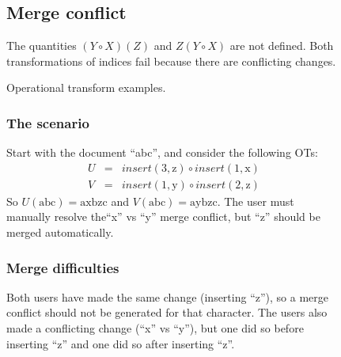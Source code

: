 \documentclass[11pt,titlepage]{article}
\begin{document}
\begin{figure}[h]
\begin{minipage}{\textwidth}
\begin{multicols}{2}
      \subsection*{Merge conflict}
      The quantities \((Y \circ X)(Z)\) and \(Z(Y \circ X)\) are not
      defined.  Both transformations of indices fail because there are
      conflicting changes.
    \end{multicols}
  \end{minipage}
  \caption{Operational transform examples.}
  \label{fig:ot}
\end{figure}

\begin{figure}[h]
  \centering
  \begin{minipage}{\textwidth}
    \begin{multicols}{2}
      \subsubsection*{The scenario}
      Start with the document ``abc'', and consider the following OTs:
      \begin{eqnarray*}
        U &=& insert(3, \mathrm{z}) \circ insert(1, \mathrm{x}) \\
        V &=& insert(1, \mathrm{y}) \circ insert(2, \mathrm{z})
      \end{eqnarray*}
      So \(U(\mathrm{abc}) = \mathrm{axbzc}\) and \(V(\mathrm{abc}) =
      \mathrm{aybzc}\).  The user must manually resolve the``x'' vs
      ``y'' merge conflict, but ``z'' should be merged automatically.
      \subsubsection*{Merge difficulties}
      Both users have made the same change (inserting ``z''), so a
      merge conflict should not be generated for that character.  The
      users also made a conflicting change (``x'' vs ``y''), but one
      did so before inserting ``z'' and one did so after inserting
      ``z''.

\end{multicols}
\end{minipage}
\end{figure}
\end{document}

